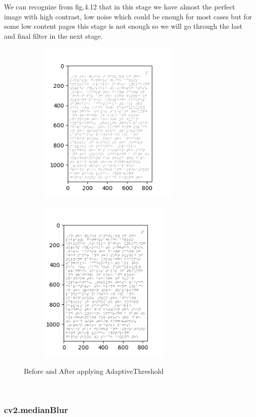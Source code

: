 \quad We can recognize from fig.4.12 that in this stage we have almost the
perfect image with high contrast, low noise which could be enough for
most cases but for some low content pages this stage is not enough so we
will go through the last and final filter in the next stage.\\

\begin{figure}[h!]
     \centering
     \begin{subfigure}
         \centering
         \includegraphics[width=.49\textwidth,height=8cm]{image16.png}
     \end{subfigure}
     \hfill
     \begin{subfigure}
         \centering
         \includegraphics[width=.47\textwidth,height=8cm]{image19.png}
     \end{subfigure}
        \caption{Before and After applying AdaptiveThreshold}
        \label{fig:Clear real braille samples}
\end{figure}\\
\newpage
\hypertarget{cv2.medianblur}{%
\subsubsection{cv2.medianBlur}\label{cv2.medianBlur}}\\

